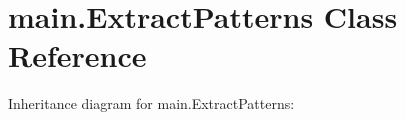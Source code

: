 \hypertarget{classmain_1_1_extract_patterns}{}\section{main.\+Extract\+Patterns Class Reference}
\label{classmain_1_1_extract_patterns}


Inheritance diagram for main.\+Extract\+Patterns\+:
